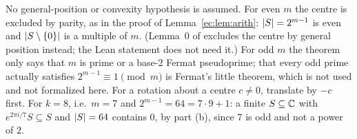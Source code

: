 \begin{remark}\label{ec:rem:l0}
No general-position or convexity hypothesis is assumed. For even $m$ the centre is excluded by parity, as in the proof
of Lemma~\ref{ec:lem:arith}: $\lvert S\rvert=2^{m-1}$ is even and $\lvert S\setminus\{0\}\rvert$ is a multiple of $m$. (Lemma~0 of
 excludes the centre by general position instead; the Lean statement does not
need it.) For odd $m$ the theorem only says that $m$ is prime or a base-$2$ Fermat pseudoprime; that every odd prime
actually satisfies $2^{m-1}\equiv1\pmod m$ is Fermat's little theorem, which is not used and not formalized here. For
a rotation about a centre $c\ne0$, translate by $-c$ first. For $k=8$, i.e.\ $m=7$ and $2^{m-1}=64=7\cdot9+1$: a
finite $S\subseteq\mathbb C$ with $e^{2\pi i/7}S\subseteq S$ and $\lvert S\rvert=64$ contains $0$, by part (b), since $7$ is odd and
not a power of $2$.
\end{remark}

